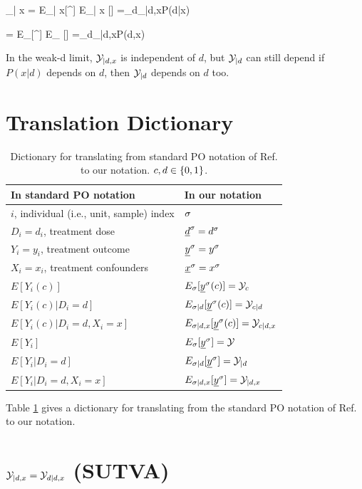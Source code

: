 \beq
\caly_{| x}
=
E_{\s| x}[\rvy^\s]
\rarrow
E_{\rvy| x} [\rvy]
=\sum_d\caly_{|d,x}P(d|x)
\eeq

\beq
\caly
=
E_{\s}[\rvy^\s]
\rarrow
E_{\rvy} [\rvy]
=\sum_d\caly_{|d,x}P(d,x)
\eeq


In the weak-d limit,
${\cal Y}_{|d,x}$ is independent
of $d$, but
${\cal Y}_{|d}$ can still depend
if $P(x|d)$ depends on $d$,
then
 ${\cal Y}_{|d}$ depends on $d$ too.




\section{Translation Dictionary}

\begin{table}[h!]
\renewcommand{\arraystretch}{1.5}
\centering
\begin{tabular}{|l|l|}
\hline
\rowcolor[HTML]{ECF4FF} 
In standard PO notation&
In our notation \\
\hline
$i$, individual (i.e., unit, sample) index& $\sigma$ \\ 
\hline 
$D_i=d_i$, treatment dose & ${\underline{d}}^\sigma=d^\sigma$\\
\hline 
$Y_i=y_i$, treatment outcome& ${\underline{y}}^\sigma=y^\sigma$ \\ 
\hline 
$X_i=x_i$, treatment confounders& ${\underline{x}}^\sigma=x^\sigma$ \\ 
\hline
$E[Y_i(c)]$ & 
$E_{\sigma}[{\underline{y}}^\sigma(c)]={\cal Y}_{c}$ \\
\hline
$E[Y_i(c)|D_i= d]$ & 
$E_{\sigma| d}[{\underline{y}}^\sigma(c)]={\cal Y}_{c| d}$\\
\hline
$E[Y_i(c)|D_i= d, X_i=x]$ & 
$E_{\sigma| d,x}[{\underline{y}}^\sigma(c)]={\cal Y}_{c| d,x}$\\
\hline
$E[Y_i]$ & 
$E_{\sigma}[{\underline{y}}^\sigma]={\cal Y}$ \\
\hline
$E[Y_i|D_i= d]$ & 
$E_{\sigma| d}[{\underline{y}}^\sigma]={\cal Y}_{| d}$\\
\hline
$E[Y_i|D_i= d, X_i=x]$ & 
$E_{\sigma| d,x}[{\underline{y}}^\sigma]={\cal Y}_{| d,x}$\\
\hline
\end{tabular}
\caption{Dictionary for 
translating
from standard PO notation
of Ref.\cite{book-mixtape} 
to our notation. $c, d\in \{0,1\}$.
}
\label{tab-pot-out-dict}
\end{table}
\renewcommand{\arraystretch}{1}

Table \ref{tab-pot-out-dict}
gives a dictionary for 
translating
from the standard PO notation 
of Ref.\cite{book-mixtape}
to our notation. 


\section{${\cal Y}_{|d,x}
={\cal Y}_{d|d,x}$ (SUTVA)}



